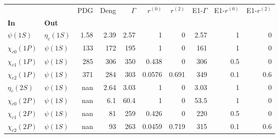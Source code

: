 \begin{tabular}{l|l|r|r|r|r|r|r|r|r}
\toprule
                &            &  PDG &  Deng &  $\Gamma$ &  $r^{(0)}$ &  $r^{(2)}$ &  E1-$\Gamma$ &  E1-$r^{(0)}$ &  E1-$r^{(2)}$ \\
\textbf{In} & \textbf{Out} &      &       &           &            &            &              &               &               \\
\midrule
\textbf{$\psi(1S)$} & \textbf{$\eta_{c}(1S)$} & 1.58 &  2.39 &      2.57 &          1 &          0 &         2.57 &             1 &             0 \\
\textbf{$\chi_{c0}(1P)$} & \textbf{$\psi(1S)$} &  133 &   172 &       195 &          1 &          0 &          161 &             1 &             0 \\
\textbf{$\chi_{c1}(1P)$} & \textbf{$\psi(1S)$} &  285 &   306 &       350 &      0.438 &          0 &          306 &           0.5 &             0 \\
\textbf{$\chi_{c2}(1P)$} & \textbf{$\psi(1S)$} &  371 &   284 &       303 &     0.0576 &      0.691 &          349 &           0.1 &           0.6 \\
\textbf{$\eta_{c}(2S)$} & \textbf{$\psi(1S)$} &  nan &  2.64 &      3.03 &          1 &          0 &         3.03 &             1 &             0 \\
\textbf{$\chi_{c0}(2P)$} & \textbf{$\psi(1S)$} &  nan &   6.1 &      60.4 &          1 &          0 &         53.5 &             1 &             0 \\
\textbf{$\chi_{c1}(2P)$} & \textbf{$\psi(1S)$} &  nan &    81 &       259 &      0.426 &          0 &          220 &           0.5 &             0 \\
\textbf{$\chi_{c2}(2P)$} & \textbf{$\psi(1S)$} &  nan &    93 &       263 &     0.0459 &      0.719 &          315 &           0.1 &           0.6 \\
\bottomrule
\end{tabular}
